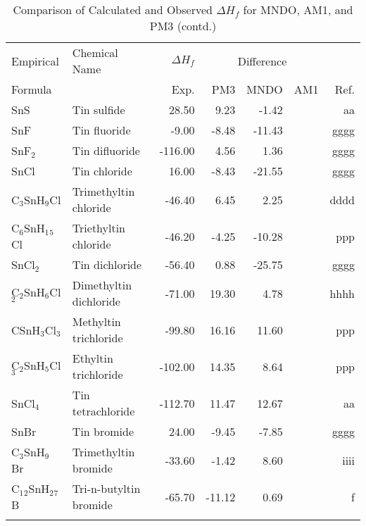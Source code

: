 \begin{table}
\caption{Comparison of Calculated and Observed $\Delta H_f$ 
for MNDO, AM1, and PM3 (contd.)}
\begin{center}
\compresstable
\begin{tabular}{llrrrrr}
Empirical & Chemical Name & $\Delta H_f$ & \multicolumn{3}{c}{Difference} & \\
Formula   &               & Exp. & PM3 &  MNDO  &  AM1 &     Ref.\\
\hline
 SnS         & Tin sulfide                            &    28.50    &     9.23  &    -1.42  &  &     aa\\
 SnF         & Tin fluoride                           &    -9.00    &    -8.48  &   -11.43  &  &   gggg\\
 SnF$_2$        & Tin difluoride                         &  -116.00    &     4.56  &     1.36  &  &   gggg\\
 SnCl        & Tin chloride                           &    16.00    &    -8.43  &   -21.55  &  &   gggg\\
 C$_3$SnH$_9$Cl    & Trimethyltin chloride                  &   -46.40    &     6.45  &     2.25  &  &   dddd\\
 C$_6$SnH$_1$$_5$Cl   & Triethyltin chloride                   &   -46.20    &    -4.25  &   -10.28  &  &    ppp\\
 SnCl$_2$       & Tin dichloride                         &   -56.40    &     0.88  &   -25.75  &  &   gggg\\
 C$_2$SnH$_6$Cl$_2$   & Dimethyltin dichloride                 &   -71.00    &    19.30  &     4.78  &  &   hhhh\\
 CSnH$_3$Cl$_3$    & Methyltin trichloride                  &   -99.80    &    16.16  &    11.60  &  &    ppp\\
 C$_2$SnH$_5$Cl$_3$   & Ethyltin trichloride                   &  -102.00    &    14.35  &     8.64  &  &    ppp\\
 SnCl$_4$       & Tin tetrachloride                      &  -112.70    &    11.47  &    12.67  &  &     aa\\
 SnBr        & Tin bromide                            &    24.00    &    -9.45  &    -7.85  &  &   gggg\\
 C$_3$SnH$_9$Br    & Trimethyltin bromide                   &   -33.60    &    -1.42  &     8.60  &  &   iiii\\
 C$_1$$_2$SnH$_2$$_7$B   & Tri-n-butyltin bromide                 &   -65.70    &   -11.12  &     0.69  &  &      f\\
$$
\end{tabular}
\end{center}
\end{table}
